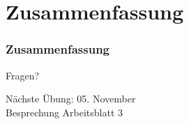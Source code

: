 \documentclass[c,18pt]{beamer}
\begin{document}
\setcounter{exercise}{4}

\setcounter{exercise}{5}

\setcounter{exercise}{6}




\section{Zusammenfassung}
\begin{frame}
  \frametitle{Zusammenfassung}%
\tableofcontents
\end{frame}

\begin{frame}
\centering
\Huge\textcolor{KITgreen}{Fragen?}
\vspace{2cm}

{\LARGE
N\"achste \"Ubung: 05. November\\
Besprechung Arbeitsblatt 3
}
\end{frame}


\end{document}
